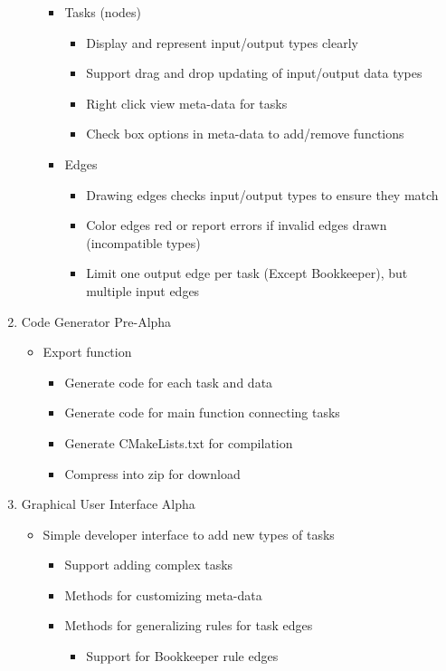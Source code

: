 \documentclass[]{article}
\begin{document}
\begin{enumerate}
\begin{itemize}
\begin{itemize}
	  \item Tasks (nodes)
	  	\begin{itemize}
	  	\item Display and represent input/output types clearly
	  	\item Support drag and drop updating of input/output data types
	  	\item Right click view meta-data for tasks
	  	\item Check box options in meta-data to add/remove functions
	  	\end{itemize}	
	  \item Edges
	    \begin{itemize}
	    \item Drawing edges checks input/output types to ensure they match
	    \item Color edges red or report errors if invalid edges drawn (incompatible types)
	    \item Limit one output edge per task (Except Bookkeeper), but multiple input edges
	    \end{itemize}	
	  \end{itemize}
  \end{itemize}
  \item Code Generator Pre-Alpha
  	\begin{itemize}
  	\item Export function
  		\begin{itemize}
  		\item Generate code for each task and data
  		\item Generate code for main function connecting tasks
  		\item Generate CMakeLists.txt for compilation
  		\item Compress into zip for download
  		\end{itemize}	
  	\end{itemize}
  \item Graphical User Interface Alpha
  	\begin{itemize}
  	\item Simple developer interface to add new types of tasks
      \begin{itemize}
      \item Support adding complex tasks
	  \item Methods for customizing meta-data
	  \item Methods for generalizing rules for task edges
	  	\begin{itemize}
	  	\item Support for Bookkeeper rule edges

\end{itemize}
\end{itemize}
\end{itemize}
\end{enumerate}
\end{document}

